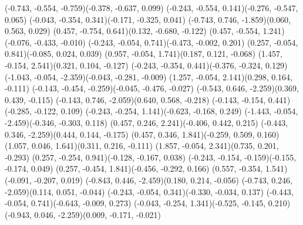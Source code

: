 \pstThreeDLine[linecolor=gray](-0.743, -0.554, -0.759)(-0.378, -0.637, 0.099)
\pstThreeDLine[linecolor=black](-0.243, -0.554, 0.141)(-0.276, -0.547, 0.065)
\pstThreeDLine[linecolor=black](-0.043, -0.354, 0.341)(-0.171, -0.325, 0.041)
\pstThreeDLine[linecolor=gray](-0.743, 0.746, -1.859)(0.060, 0.563, 0.029)
\pstThreeDLine[linecolor=black](0.457, -0.754, 0.641)(0.132, -0.680, -0.122)
\pstThreeDLine[linecolor=black](0.457, -0.554, 1.241)(-0.076, -0.433, -0.010)
\pstThreeDLine[linecolor=black](-0.243, -0.054, 0.741)(-0.473, -0.002, 0.201)
\pstThreeDLine[linecolor=black](0.257, -0.054, 0.841)(-0.085, 0.024, 0.039)
\pstThreeDLine[linecolor=black](0.957, -0.054, 1.741)(0.187, 0.121, -0.068)
\pstThreeDLine[linecolor=black](1.457, -0.154, 2.541)(0.321, 0.104, -0.127)
\pstThreeDLine[linecolor=black](-0.243, -0.354, 0.441)(-0.376, -0.324, 0.129)
\pstThreeDLine[linecolor=gray](-1.043, -0.054, -2.359)(-0.043, -0.281, -0.009)
\pstThreeDLine[linecolor=black](1.257, -0.054, 2.141)(0.298, 0.164, -0.111)
\pstThreeDLine[linecolor=gray](-0.143, -0.454, -0.259)(-0.045, -0.476, -0.027)
\pstThreeDLine[linecolor=gray](-0.543, 0.646, -2.259)(0.369, 0.439, -0.115)
\pstThreeDLine[linecolor=gray](-0.143, 0.746, -2.059)(0.640, 0.568, -0.218)
\pstThreeDLine[linecolor=black](-0.143, -0.154, 0.441)(-0.285, -0.122, 0.109)
\pstThreeDLine[linecolor=black](-0.243, -0.254, 1.141)(-0.623, -0.168, 0.249)
\pstThreeDLine[linecolor=gray](-1.443, -0.054, -2.459)(-0.346, -0.303, 0.118)
\pstThreeDLine[linecolor=black](0.457, 0.246, 2.241)(-0.406, 0.442, 0.215)
\pstThreeDLine[linecolor=gray](-0.443, 0.346, -2.259)(0.444, 0.144, -0.175)
\pstThreeDLine[linecolor=black](0.457, 0.346, 1.841)(-0.259, 0.509, 0.160)
\pstThreeDLine[linecolor=black](1.057, 0.046, 1.641)(0.311, 0.216, -0.111)
\pstThreeDLine[linecolor=black](1.857, -0.054, 2.341)(0.735, 0.201, -0.293)
\pstThreeDLine[linecolor=black](0.257, -0.254, 0.941)(-0.128, -0.167, 0.038)
\pstThreeDLine[linecolor=gray](-0.243, -0.154, -0.159)(-0.155, -0.174, 0.049)
\pstThreeDLine[linecolor=black](0.257, -0.454, 1.841)(-0.456, -0.292, 0.166)
\pstThreeDLine[linecolor=black](0.557, -0.354, 1.541)(-0.091, -0.207, 0.019)
\pstThreeDLine[linecolor=gray](-0.843, 0.446, -2.459)(0.180, 0.214, -0.056)
\pstThreeDLine[linecolor=gray](-0.743, 0.246, -2.059)(0.114, 0.051, -0.044)
\pstThreeDLine[linecolor=black](-0.243, -0.054, 0.341)(-0.330, -0.034, 0.137)
\pstThreeDLine[linecolor=black](-0.443, -0.054, 0.741)(-0.643, -0.009, 0.273)
\pstThreeDLine[linecolor=black](-0.043, -0.254, 1.341)(-0.525, -0.145, 0.210)
\pstThreeDLine[linecolor=gray](-0.943, 0.046, -2.259)(0.009, -0.171, -0.021)
